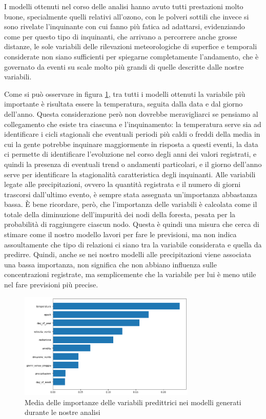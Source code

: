\documentclass[a4paper]{report}
\begin{document}
I modelli ottenuti nel corso delle analisi hanno avuto tutti prestazioni molto buone, specialmente quelli relativi all'ozono, con le polveri sottili che invece si sono rivelate l'inquinante con cui fanno più fatica ad adattarsi, evidenziando come per questo tipo di inquinanti, che arrivano a percorrere anche grosse distanze, le sole variabili delle rilevazioni meteorologiche di superfice e temporali considerate non siano sufficienti per spiegarne completamente l'andamento, che è governato da eventi su scale molto più grandi di quelle descritte dalle nostre variabili. 

Come si può osservare in figura \ref{fig:importanza_tot}, tra tutti i modelli ottenuti la variabile più importante è risultata essere la temperatura, seguita dalla data e dal giorno dell'anno. Questa considerazione però non dovrebbe meravigliarci se pensiamo al collegamento che esiste tra ciascuna e l'inquinamento: la temperatura serve sia ad identificare i cicli stagionali che eventuali periodi più caldi o freddi della media in cui la gente potrebbe inquinare maggiormente in risposta a questi eventi, la data ci permette di identificare l'evoluzione nel corso degli anni dei valori registrati, e quindi la presenza di eventuali trend o andamenti particolari, e il giorno dell'anno serve per identificare la stagionalità caratteristica degli inquinanti.  
Alle variabili legate alle precipitazioni, ovvero la quantità registrata e il numero di giorni trascorsi dall'ultimo evento, è sempre stata assegnata un'importanza abbastanza bassa. È bene ricordare, però, che l'importanza delle variabili è calcolata come il totale della diminuzione dell'impurità dei nodi della foresta, pesata per la probabilità di raggiungere ciascun nodo. Questa è quindi una misura che cerca di stimare come il nostro modello lavori per fare le previsioni, ma non indica assoultamente che tipo di relazioni ci siano tra la variabile considerata e quella da predirre. Quindi, anche se nei nostro modelli alle precipitazioni viene associata una bassa importanza, non significa che non abbiano influenza sulle concentrazioni registrate, ma semplicemente che la variabile per lui è meno utile nel fare previsioni più precise. 

\begin{figure}[h]
\centering
\includegraphics[width=0.75\textwidth]{intro_importanza_totale}
\caption{Media delle importanze delle variabili predittrici nei modelli generati durante le nostre analisi}
\label{fig:importanza_tot}
\end{figure}
\end{document}
